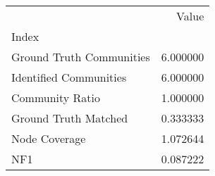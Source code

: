 \begin{tabular}{lr}
\toprule
{} &     Value \\
Index                    &           \\
\midrule
Ground Truth Communities &  6.000000 \\
Identified Communities   &  6.000000 \\
Community Ratio          &  1.000000 \\
Ground Truth Matched     &  0.333333 \\
Node Coverage            &  1.072644 \\
NF1                      &  0.087222 \\
\bottomrule
\end{tabular}
